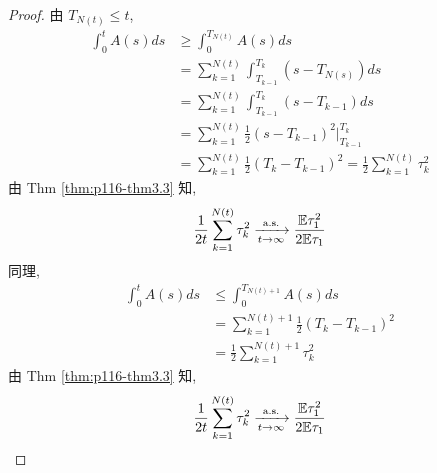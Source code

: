 \begin{proof}
    由 $T_{N(t)}\leq t$,
    \[
    \begin{aligned}
        \int_0^t A(s)ds &\geq \int_0^{T_{N(t)}}A(s)ds\\
        &=\sum_{k=1}^{N(t)}\int_{T_{k-1}}^{T_k}(s-T_{N(s)})ds\\
        &=\sum_{k=1}^{N(t)}\int_{T_{k-1}}^{T_k}(s-T_{k-1})ds\\
        &=\sum_{k=1}^{N(t)}\frac{1}{2}(s-T_{k-1})^2\bigg|_{T_{k-1}}^{T_k}\\
        &=\sum_{k=1}^{N(t)}\frac{1}{2}(T_k-T_{k-1})^2=\frac{1}{2}\sum_{k=1}^{N(t)}\tau_k^2
    \end{aligned}
    \]
    由 Thm \ref{thm:p116-thm3.3} 知,
    \[
    \frac{1}{2t}\sum_{k=1}^{N(t)}\tau_k^2\xrightarrow[t\to\infty]{\text{a.s.}}\frac{\mathbb E \tau_1^2}{2\mathbb E\tau_1}
    \]
    同理,
    \[
    \begin{aligned}
        \int_0^t A(s)ds &\leq \int_0^{T_{N(t)+1}} A(s)ds\\
        &=\sum_{k=1}^{N(t)+1}\frac{1}{2}(T_k-T_{k-1})^2\\
        &=\frac{1}{2}\sum_{k=1}^{N(t)+1}\tau_k^2
    \end{aligned}
    \]
    由 Thm \ref{thm:p116-thm3.3} 知,
    \[
        \frac{1}{2t}\sum_{k=1}^{N(t)}\tau_k^2\xrightarrow[t\to\infty]{\text{a.s.}}\frac{\mathbb E \tau_1^2}{2\mathbb E\tau_1}
    \]
\end{proof}
\newpage